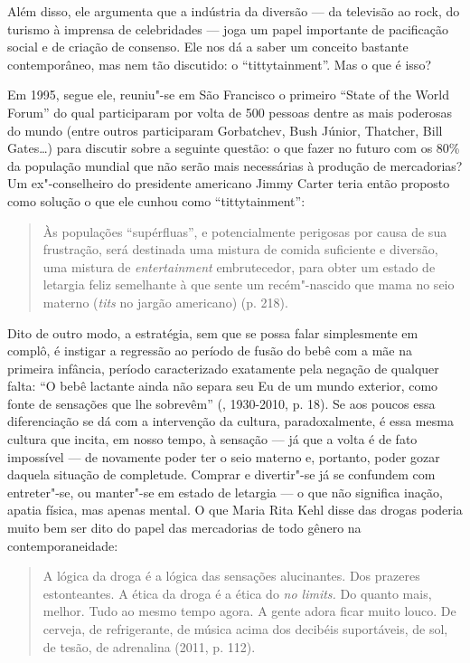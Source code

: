 Além disso, ele argumenta que a indústria da diversão --- da televisão
ao rock, do turismo à imprensa de celebridades --- joga um papel
importante de pacificação social e de criação de consenso. Ele nos dá a
saber um conceito bastante contemporâneo, mas nem tão discutido: o
``tittytainment''. Mas o que é isso?

Em 1995, segue ele, reuniu"-se em São Francisco o primeiro ``State of the
World Forum'' do qual participaram por volta de 500 pessoas dentre as
mais poderosas do mundo (entre outros participaram Gorbatchev, Bush
Júnior, Thatcher, Bill Gates\ldots{}) para discutir sobre a seguinte questão:
o que fazer no futuro com os 80\% da população mundial que não serão
mais necessárias à produção de mercadorias? Um ex"-conselheiro do
presidente americano Jimmy Carter teria então proposto como solução o
que ele cunhou como ``tittytainment'':

\begin{quote}
Às populações ``supérfluas'', e potencialmente perigosas por causa de
sua frustração, será destinada uma mistura de comida suficiente e
diversão, uma mistura de \emph{entertainment} embrutecedor, para obter
um estado de letargia feliz semelhante à que sente um recém"-nascido que
mama no seio materno (\emph{tits} no jargão americano) (p. 218).
\end{quote}

Dito de outro modo, a estratégia, sem que se possa falar simplesmente em
complô, é instigar a regressão ao período de fusão do bebê com a mãe na
primeira infância, período caracterizado exatamente pela negação de
qualquer falta: ``O bebê lactante ainda não separa seu Eu de um mundo
exterior, como fonte de sensações que lhe sobrevêm'' (, 1930-2010,
p. 18). Se aos poucos essa diferenciação se dá com a intervenção da
cultura, paradoxalmente, é essa mesma cultura que incita, em nosso
tempo, à sensação --- já que a volta é de fato impossível --- de
novamente poder ter o seio materno e, portanto, poder gozar daquela
situação de completude. Comprar e divertir"-se já se confundem com
entreter"-se, ou manter"-se em estado de letargia --- o que não significa
inação, apatia física, mas apenas mental. O que Maria Rita Kehl disse
das drogas poderia muito bem ser dito do papel das mercadorias de todo
gênero na contemporaneidade:

\begin{quote}
A lógica da droga é a lógica das sensações alucinantes. Dos prazeres
estonteantes. A ética da droga é a ética do \emph{no limits.} Do quanto
mais, melhor. Tudo ao mesmo tempo agora. A gente adora ficar muito
louco. De cerveja, de refrigerante, de música acima dos decibéis
suportáveis, de sol, de tesão, de adrenalina (2011, p. 112).
\end{quote}

